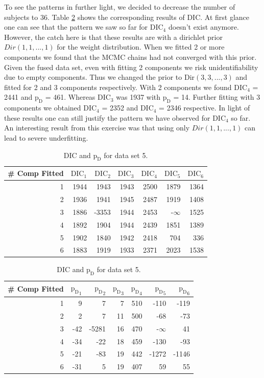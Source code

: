 To see the patterns in further light, we decided to decrease the number of subjects to 36. Table \ref{table : ds_3fused_3ppg_dic} shows the corresponding results of DIC. At first glance one can see that the pattern we saw so far for $\text{DIC}_4$ doesn't exist anymore. However, the catch here is that these results are with a dirichlet prior $Dir(1, 1, ..., 1)$ for the weight distribution. When we fitted 2 or more components we found that the MCMC chains had not converged with this prior. Given the fused data set, even with fitting 2 components we risk unidentifiability due to empty components. Thus we changed the prior to $\text{Dir}(3, 3, ..., 3)$ and fitted for 2 and 3 components respectively. With 2 components we found $\text{DIC}_4$ = 2441 and $\text{p}_\text{D}$ = 461. Whereas $\text{DIC}_3$ was 1937 with $\text{p}_\text{D}$ = 14. Further fitting with 3 components we obtained $\text{DIC}_4$ = 2352 and $\text{DIC}_4$ = 2346 respective. In light of these results one can still justify the pattern we have observed for $\text{DIC}_4$ so far. An interesting result from this exercise was that using only $Dir(1, 1, ..., 1)$ can lead to severe underfitting. 

\begin{table}[!htb]
\centering
\caption{DIC and $\text{p}_\text{D}$ for data set 5.}
\label{table : ds_3fused_3ppg_dic}
\begin{tabular}{@{}rrrrrrr@{}}
\toprule
\# Comp Fitted & $\text{DIC}_1$ & $\text{DIC}_2$  & $\text{DIC}_3$  & $\text{DIC}_4$  & $\text{DIC}_5$  & $\text{DIC}_6$  \\ \midrule
1 & 1944 & 1943 & 1943 & 2500 & 1879 & 1364 \\
2 & 1936 & 1941 & 1945 & 2487 & 1919 & 1408 \\
3 & 1886 & -3353 & 1944 & 2453 & -$\infty$ & 1525 \\
4 & 1892 & 1904 & 1944 & 2439 & 1851 & 1389 \\
5 & 1902 & 1840 & 1942 & 2418 & 704 & 336 \\
6 & 1883 & 1919 & 1933 & 2371 & 2023 & 1538 \\ \bottomrule
\end{tabular}

\begin{tabular}{@{}rrrrrrr@{}}
\toprule
\# Comp Fitted & ${\text{p}_\text{D}}_1$ & ${\text{p}_\text{D}}_2$ & ${\text{p}_\text{D}}_3$ & ${\text{p}_\text{D}}_4$ & ${\text{p}_\text{D}}_5$ & ${\text{p}_\text{D}}_6$ \\ \midrule
1 & 9 & 7 & 7 & 510 & -110 & -119 \\
2 & 2 & 7 & 11 & 500 & -68 & -73 \\
3 & -42 & -5281 & 16 & 470 & -$\infty$ & 41 \\
4 & -34 & -22 & 18 & 459 & -130 & -93 \\
5 & -21 & -83 & 19 & 442 & -1272 & -1146 \\
6 & -31 & 5 & 19 & 407 & 59 & 55 \\ \bottomrule
\end{tabular}
\end{table}


